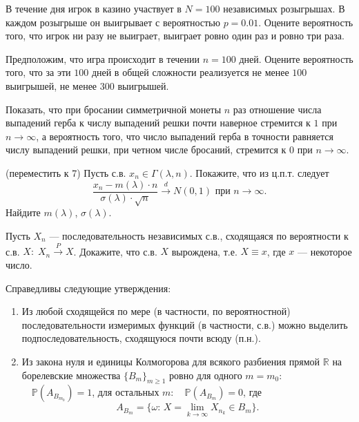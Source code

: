 \begin{problem}
В течение дня игрок в казино участвует в $N=100$ независимых розыгрышах. В каждом розыгрыше он выигрывает с вероятностью 
$p=0.01$. Оцените вероятность того, что игрок ни разу не выиграет, выиграет ровно 
один раз и ровно три раза.

Предположим, что игра происходит в течении $n=100$ дней. 
Оцените вероятность того, что за эти $100$ дней в общей сложности реализуется не менее $100$ выигрышей, не менее $300$ выигрышей. 


\end{problem}



\begin{problem}

Показать, что при бросании симметричной монеты $n$ раз отношение числа выпадений герба к числу выпадений решки почти наверное стремится 
к $1$ при $n\to\infty$, а вероятность того, что число выпадений герба в точности равняется числу выпадений решки, при четном числе 
бросаний, стремится к $0$ при $n\to\infty$. 
\end{problem}



\begin{problem} (переместить к 7)
Пусть с.в. $x_n\in \Gamma(\lambda,n)$. Покажите, что из ц.п.т. следует 
$$
\frac{x_n-m(\lambda)\cdot n}{\sigma(\lambda)\cdot\sqrt{n}} \xrightarrow{d} N(0,1) \text{ при } n\to\infty . 
$$
Найдите $m(\lambda)$, $\sigma(\lambda)$. 
\end{problem}



\begin{problem}
Пусть $X_n$ --- последовательность независимых с.в., сходящаяся по вероятности к с.в. $X:\; X_n\xrightarrow{P}X$. Докажите, 
что с.в. $X$ вырождена, т.е. $X\equiv x$, где $x$ --- некоторое число. 
\end{problem}

\begin{ordre}

Справедливы следующие утверждения:

\begin{enumerate}
\item
Из любой сходящейся по мере (в частности, по вероятностной) последовательности 
измеримых функций (в частности, с.в.) можно выделить подпоследовательность, сходящуюся почти всюду (п.н.). 

\item
Из закона нуля и единицы Колмогорова для всякого разбиения прямой ${\mathbb R}$ на борелевские множества $\{ B_m\}_{m\geqslant 1}$ 
ровно для одного $m=m_0:$ $\quad {\mathbb P}(A_{B_{m_0}})=1$, для остальных $m:\quad {\mathbb P}(A_{B_m})=0$, где 
$$
A_{B_m}=\{ \omega: \, X=\lim\limits_{k\to\infty} X_{n_k}\in B_m \} . 
$$
\end{enumerate}
\end{ordre}



